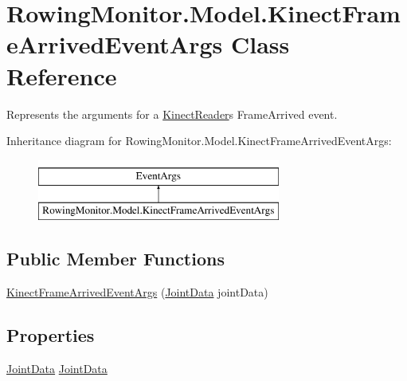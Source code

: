 \hypertarget{class_rowing_monitor_1_1_model_1_1_kinect_frame_arrived_event_args}{}\section{Rowing\+Monitor.\+Model.\+Kinect\+Frame\+Arrived\+Event\+Args Class Reference}
\label{class_rowing_monitor_1_1_model_1_1_kinect_frame_arrived_event_args}


Represents the arguments for a \hyperlink{class_rowing_monitor_1_1_model_1_1_kinect_reader}{Kinect\+Reader}\textquotesingle{}s Frame\+Arrived event.  


Inheritance diagram for Rowing\+Monitor.\+Model.\+Kinect\+Frame\+Arrived\+Event\+Args\+:\begin{figure}[H]
\begin{center}
\leavevmode
\includegraphics[height=2.000000cm]{class_rowing_monitor_1_1_model_1_1_kinect_frame_arrived_event_args}
\end{center}
\end{figure}
\subsection*{Public Member Functions}
\begin{DoxyCompactItemize}
\item 
\hyperlink{class_rowing_monitor_1_1_model_1_1_kinect_frame_arrived_event_args_a6c0155b21bc19c9fe163c5ea9ef66b21}{Kinect\+Frame\+Arrived\+Event\+Args} (\hyperlink{struct_rowing_monitor_1_1_model_1_1_util_1_1_joint_data}{Joint\+Data} joint\+Data)
\end{DoxyCompactItemize}
\subsection*{Properties}
\begin{DoxyCompactItemize}
\item 
\hyperlink{struct_rowing_monitor_1_1_model_1_1_util_1_1_joint_data}{Joint\+Data} \hyperlink{class_rowing_monitor_1_1_model_1_1_kinect_frame_arrived_event_args_a2249c19be25bb9b2c3627fb1bfa7512b}{Joint\+Data}
\end{DoxyCompactItemize}



